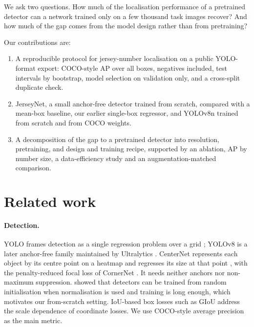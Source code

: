 \documentclass[10pt,a4paper]{article}
\begin{document}
We ask two questions. How much of the localisation performance of a pretrained detector can a
network trained only on a few thousand task images recover? And how much of the gap comes from
the model design rather than from pretraining?

Our contributions are:
\begin{enumerate}
  \item A reproducible protocol for jersey-number localisation on a public YOLO-format export:
    COCO-style AP over all boxes, negatives included, test intervals by bootstrap, model
    selection on validation only, and a cross-split duplicate check.
  \item JerseyNet, a small anchor-free detector trained from scratch, compared with a mean-box
    baseline, our earlier single-box regressor, and YOLOv8n trained from scratch and from COCO
    weights.
  \item A decomposition of the gap to a pretrained detector into resolution, pretraining, and
    design and training recipe, supported by an ablation, AP by number size, a data-efficiency
    study and an augmentation-matched comparison.
\end{enumerate}

\section{Related work}

\paragraph{Detection.} YOLO frames detection as a single regression problem over a grid
\citep{redmon2016yolo}; YOLOv8 is a later anchor-free family maintained by Ultralytics
\citep{jocher2023yolov8}. CenterNet represents each object by its centre point on a heatmap and
regresses its size at that point \citep{zhou2019objects}, with the penalty-reduced focal loss of
CornerNet \citep{law2018cornernet}. It needs neither anchors nor non-maximum suppression.
\citet{he2019rethinking} showed that detectors can be trained from random initialisation when
normalisation is used and training is long enough, which motivates our from-scratch setting.
IoU-based box losses such as GIoU \citep{rezatofighi2019giou} address the scale dependence of
coordinate losses. We use COCO-style average precision \citep{lin2014coco} as the main metric.
\end{document}
